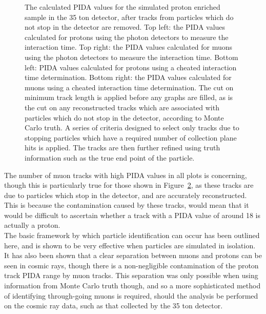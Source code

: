 \begin{figure}
\begin{subfigure}{0.48\textwidth}
        \label{fig:CRY_PIDACheat_Muon_Cheat}
  \end{subfigure}
  \caption[The calculated PIDA values for the simulated proton enriched sample in the 35 ton detector, after tracks from particles which do not stop in the detector are removed]
          {The calculated PIDA values for the simulated proton enriched sample in the 35 ton detector, after tracks from particles which do not stop in the detector are removed. Top left: the PIDA values calculated for protons using the photon detectors to measure the interaction time. Top right: the PIDA values calculated for muons using the photon detectors to measure the interaction time. Bottom left: PIDA values calculated for protons using a cheated interaction time determination. Bottom right: the PIDA values calculated for muons using a cheated interaction time determination. The cut on minimum track length is applied before any graphs are filled, as is the cut on any reconstructed tracks which are associated with particles which do not stop in the detector, according to Monte Carlo truth. A series of criteria designed to select only tracks due to stopping particles which have a required number of collection plane hits is applied. The tracks are then further refined using truth information such as the true end point of the particle.}
  \label{fig:CRY_PIDACheat}
\end{figure}

The number of muon tracks with high PIDA values in all plots is concerning, though this is particularly true for those shown in Figure~\ref{fig:CRY_PIDACheat}, as these tracks are due to particles which stop in the detector, and are accurately reconstructed. This is because the contamination caused by these tracks, would mean that it would be difficult to ascertain whether a track with a PIDA value of around 18 is actually a proton. \\

The basic framework by which particle identification can occur has been outlined here, and is shown to be very effective when particles are simulated in isolation. It has also been shown that a clear separation between muons and protons can be seen in cosmic rays, though there is a non-negligible contamination of the proton track PIDA range by muon tracks. This separation was only possible when using information from Monte Carlo truth though, and so a more sophisticated method of identifying through-going muons is required, should the analysis be performed on the cosmic ray data, such as that collected by the 35 ton detector. \\
